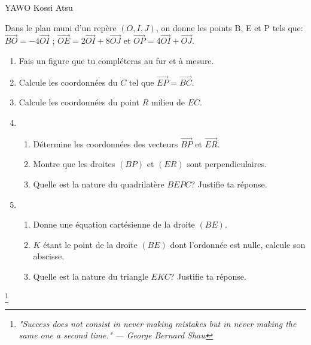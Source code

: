 \documentclass[12pt,a4paper]{book}
\newcommand{\prof}{YAWO Kossi Atsu}
\begin{document}
\begin{revision}{\prof}
\begin{exo}
Dans le plan muni d'un repère $(O,I,J)$, on donne les points B, E et P tels que: $\overrightarrow{BO}=-4\overrightarrow{OI}$ \quad ; \quad $\overrightarrow{OE}=2\overrightarrow{OI}+8\overrightarrow{OJ}$ \quad et \quad $\overrightarrow{OP}=4\overrightarrow{OI}+\overrightarrow{OJ}$.
\begin{enumerate}
\item Fais un figure que tu compléteras au fur et à mesure.
\item Calcule les coordonnées du $C$ tel que $\overrightarrow{EP}=\overrightarrow{BC}$.
\item Calcule les coordonnées du point $R$ milieu de $EC$.
\item \begin{enumerate}
\item Détermine les coordonnées des vecteurs $\overrightarrow{BP}$ et $\overrightarrow{ER}$.
\item Montre que les droites $(BP)$ et $(ER)$ sont perpendiculaires.
\item Quelle est la nature du quadrilatère $BEPC$? Justifie ta réponse.
\end{enumerate}
\item \begin{enumerate}
\item Donne une équation cartésienne de la droite $(BE)$.
\item $K$ étant le point de la droite $(BE)$ dont l'ordonnée est nulle, calcule son abscisse.
\item Quelle est la nature du triangle $EKC$? Justifie ta réponse.
\end{enumerate}
\end{enumerate}
\end{exo}
\footnote{\textit{"Success does not consist in never making mistakes but in never making the same one a second time." — George Bernard Shaw}}
\end{revision}
\end{document}
